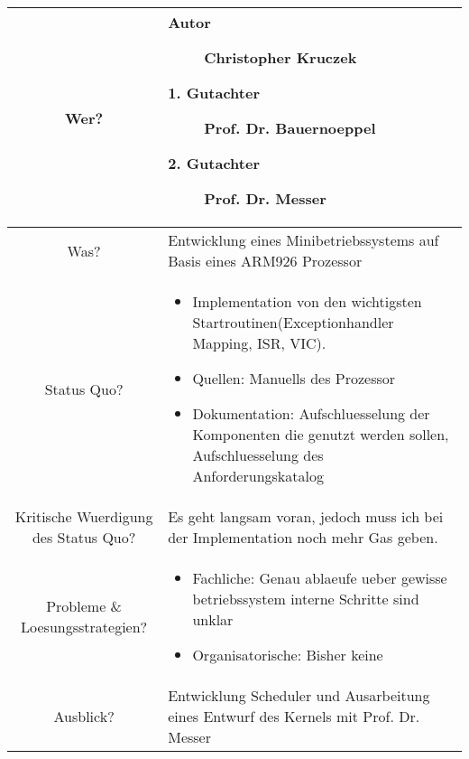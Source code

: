 \documentclass[fontsize=12pt]{scrreprt}
\begin{document}
\begin{tabular}{|c|p{10cm}|}
	\hline
	Wer? & \begin{description}
			\item[Autor] Christopher Kruczek
			\item[1. Gutachter] Prof. Dr. Bauernoeppel
			\item[2. Gutachter] Prof. Dr. Messer
		\end{description} \\ \hline
	Was? & Entwicklung eines Minibetriebssystems auf Basis eines ARM926 Prozessor \\ \hline
	Status Quo? & \begin{itemize}
					\item Implementation von den wichtigsten Startroutinen(Exceptionhandler Mapping, ISR, VIC).
					\item Quellen: Manuells des Prozessor
					\item Dokumentation: 
					Aufschluesselung der Komponenten die genutzt werden sollen, Aufschluesselung des Anforderungskatalog				\end{itemize}	\\ \hline
	Kritische Wuerdigung des Status Quo? & Es geht langsam voran, jedoch muss ich bei der Implementation noch mehr Gas geben. \\ \hline
	Probleme \& Loesungsstrategien? & \begin{itemize}
										\item Fachliche: Genau ablaeufe ueber gewisse betriebssystem interne Schritte sind unklar
										\item Organisatorische: Bisher keine
									\end{itemize} \\ \hline
	Ausblick? & Entwicklung Scheduler und Ausarbeitung eines Entwurf des Kernels mit Prof. Dr. Messer
	\\ \hline
	
	
	
\end{tabular}
\end{document}
